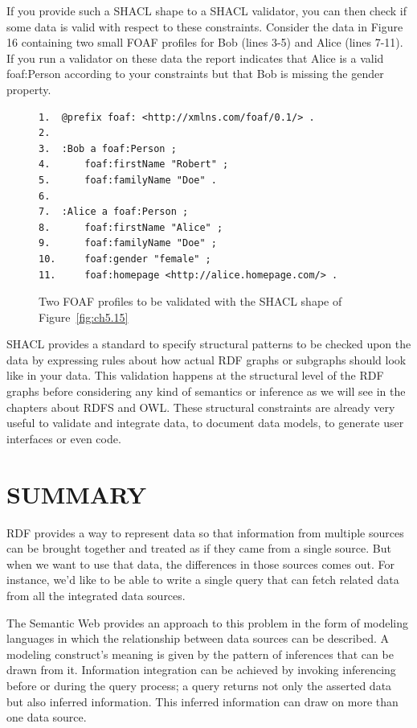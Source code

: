 If you provide such a SHACL shape to a SHACL validator, you can then
check if some data is valid with respect to these constraints. Consider
the data in Figure 16 containing two small FOAF profiles for Bob (lines
3-5) and Alice (lines 7-11). If you run a validator on these data the
report indicates that Alice is a valid foaf:Person according to your
constraints but that Bob is missing the gender property.

\begin{figure}
\begin{lstlisting}
1.	@prefix foaf: <http://xmlns.com/foaf/0.1/> .
2.	
3.	:Bob a foaf:Person ;
4.	    foaf:firstName "Robert" ;
5.	    foaf:familyName "Doe" .
6.	
7.	:Alice a foaf:Person ;
8.	    foaf:firstName "Alice" ;
9.	    foaf:familyName "Doe" ;
10.	    foaf:gender "female" ;
11.	    foaf:homepage <http://alice.homepage.com/> .
\end{lstlisting}
\label{fig:5.16}
\caption{Two FOAF profiles to be validated with the SHACL shape of Figure~\ref{fig:ch5.15}}
\end{figure}



SHACL provides a standard to specify structural patterns to be checked
upon the data by expressing rules about how actual RDF graphs or
subgraphs should look like in your data. This validation happens at the
structural level of the RDF graphs before considering any kind of
semantics or inference as we will see in the chapters about RDFS and
OWL. These structural constraints are already very useful to validate
and integrate data, to document data models, to generate user interfaces
or even code.




\section{SUMMARY}

RDF provides a way to represent data so that information from multiple
sources can be brought together and treated as if they came from a
single source. But when we want to use that data, the differences in
those sources comes out. For instance, we'd like to be able to write a
single query that can fetch related data from all the integrated data
sources.

The Semantic Web provides an approach to this problem in the form of
modeling languages in which the relationship between data sources can be
described. A modeling construct's meaning is given by the pattern of
inferences that can be drawn from it. Information integration can be
achieved by invoking inferencing before or during the query process; a
query returns not only the asserted data but also inferred information.
This inferred information can draw on more than one data source.

